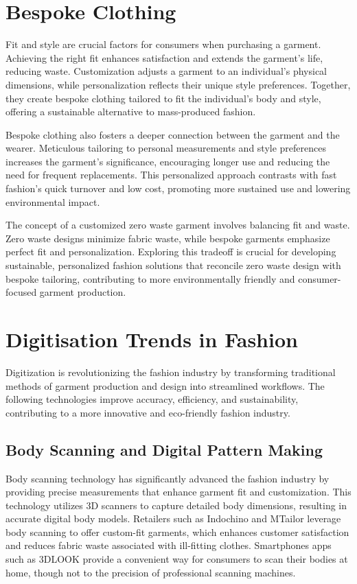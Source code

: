 \section{Bespoke Clothing}
Fit and style are crucial factors for consumers when purchasing a garment. Achieving the right fit enhances satisfaction and extends the garment's life, reducing waste. Customization adjusts a garment to an individual's physical dimensions, while personalization reflects their unique style preferences. Together, they create bespoke clothing tailored to fit the individual's body and style, offering a sustainable alternative to mass-produced fashion.

Bespoke clothing also fosters a deeper connection between the garment and the wearer. Meticulous tailoring to personal measurements and style preferences increases the garment's significance, encouraging longer use and reducing the need for frequent replacements. This personalized approach contrasts with fast fashion's quick turnover and low cost, promoting more sustained use and lowering environmental impact.

The concept of a customized zero waste garment involves balancing fit and waste. Zero waste designs minimize fabric waste, while bespoke garments emphasize perfect fit and personalization. Exploring this tradeoff is crucial for developing sustainable, personalized fashion solutions that reconcile zero waste design with bespoke tailoring, contributing to more environmentally friendly and consumer-focused garment production.

\section{Digitisation Trends in Fashion}
Digitization is revolutionizing the fashion industry by transforming traditional methods of garment production and design into streamlined workflows. The following technologies improve accuracy, efficiency, and sustainability, contributing to a more innovative and eco-friendly fashion industry.

\subsection{Body Scanning and Digital Pattern Making}
Body scanning technology has significantly advanced the fashion industry by providing precise measurements that enhance garment fit and customization. This technology utilizes 3D scanners to capture detailed body dimensions, resulting in accurate digital body models. Retailers such as Indochino and MTailor leverage body scanning to offer custom-fit garments, which enhances customer satisfaction and reduces fabric waste associated with ill-fitting clothes. Smartphones apps such as 3DLOOK provide a convenient way for consumers to scan their bodies at home, though not to the precision of professional scanning machines.

